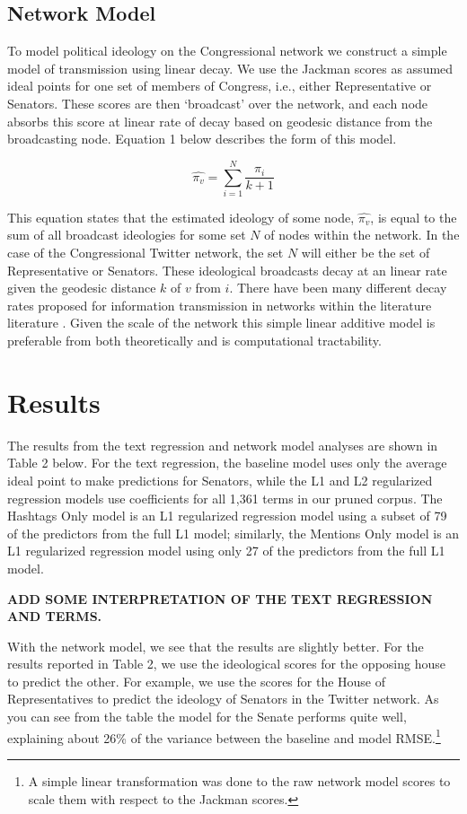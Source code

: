 \documentclass[10pt]{article}
\begin{document}
\subsection{Network Model} %
To model political ideology on the Congressional network we construct a simple model of transmission using linear decay.  We use the Jackman scores as assumed ideal points for one set of members of Congress, i.e., either Representative or Senators.  These scores are then `broadcast' over the network, and each node absorbs this score at linear rate of decay based on geodesic distance from the broadcasting node.  Equation 1 below describes the form of this model.

\begin{equation}
    \hat{\pi_{v}} = \displaystyle\sum_{i=1}^{N} \frac{\pi_{i}}{k+1}
\end{equation}

This equation states that the estimated ideology of some node, $\hat{\pi_{v}}$, is equal to the sum of all broadcast ideologies for some set $N$ of nodes within the network.  In the case of the Congressional Twitter network, the set $N$ will either be the set of Representative or Senators.  These ideological broadcasts decay at an linear rate given the geodesic distance $k$ of $v$ from $i$.  There have been many different decay rates proposed for information transmission in networks within the literature literature \citep{Wu_2004}.  Given the scale of the network this simple linear additive model is preferable from both theoretically and is computational tractability.  

\section{Results}
The results from the text regression and network model analyses are shown in Table 2 below. For the text regression, the baseline model uses only the average ideal point to make predictions for Senators, while the L1 and L2 regularized regression models use coefficients for all 1,361 terms in our pruned corpus. The Hashtags Only model is an L1 regularized regression model using a subset of 79 of the predictors from the full L1 model; similarly, the Mentions Only model is an L1 regularized regression model using only 27 of the predictors from the full L1 model.

\textbf{ADD SOME INTERPRETATION OF THE TEXT REGRESSION AND TERMS.}

With the network model, we see that the results are slightly better.  For the results reported in Table 2, we use the ideological scores for the opposing house to predict the other.  For example, we use the scores for the House of Representatives to predict the ideology of Senators in the Twitter network.  As you can see from the table the model for the Senate performs quite well, explaining about 26\% of the variance between the baseline and model RMSE.\footnote{A simple linear transformation was done to the raw network model scores to scale them with respect to the Jackman scores.}
\end{document}
